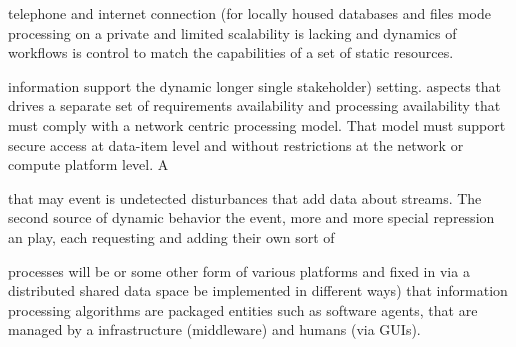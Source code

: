\documentclass[times]{cpeauth}
\begin{document}

telephone and %
internet connection (for %
locally housed databases and files %
mode processing on a private and limited %
scalability is lacking and dynamics of workflows is %
control to match the capabilities of a set of static resources.

information %
support the dynamic %
longer single stakeholder) setting.  %
aspects that drives a separate set of requirements %
availability and processing availability that must comply with a %
network centric processing model. That model must support secure access at %
data-item level and without restrictions at the network or compute platform
level. A %


that may %
event is undetected %
disturbances that add data about %
streams. The second source of dynamic behavior %
the event, more and more special repression an %
play, each requesting and adding their own sort of %


processes will be %
or some other form of %
various platforms and fixed in %
via a distributed shared data space %
be implemented in different ways) that %
information processing algorithms are packaged %
entities such as software agents, that are managed by a %
infrastructure (middleware) and humans (via GUIs).
\end{document}
